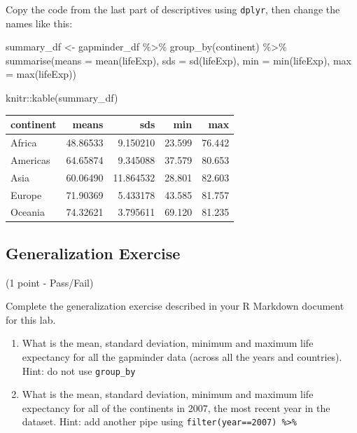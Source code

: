 \documentclass[
]{book}
\newenvironment{Shaded}{\begin{snugshade}}{\end{snugshade}}
\newcommand{\AttributeTok}[1]{\textcolor[rgb]{0.77,0.63,0.00}{#1}}
\newcommand{\FunctionTok}[1]{\textcolor[rgb]{0.00,0.00,0.00}{#1}}
\newcommand{\NormalTok}[1]{#1}
\newcommand{\OtherTok}[1]{\textcolor[rgb]{0.56,0.35,0.01}{#1}}
\newcommand{\SpecialCharTok}[1]{\textcolor[rgb]{0.00,0.00,0.00}{#1}}
\begin{document}
Copy the code from the last part of descriptives using \texttt{dplyr}, then change the names like this:

\begin{Shaded}
\begin{Highlighting}[]
\NormalTok{summary\_df }\OtherTok{\textless{}{-}}\NormalTok{ gapminder\_df }\SpecialCharTok{\%\textgreater{}\%}
               \FunctionTok{group\_by}\NormalTok{(continent) }\SpecialCharTok{\%\textgreater{}\%}
               \FunctionTok{summarise}\NormalTok{(}\AttributeTok{means =} \FunctionTok{mean}\NormalTok{(lifeExp),}
                         \AttributeTok{sds =} \FunctionTok{sd}\NormalTok{(lifeExp),}
                         \AttributeTok{min =} \FunctionTok{min}\NormalTok{(lifeExp),}
                         \AttributeTok{max =} \FunctionTok{max}\NormalTok{(lifeExp))}

\NormalTok{knitr}\SpecialCharTok{::}\FunctionTok{kable}\NormalTok{(summary\_df)}
\end{Highlighting}
\end{Shaded}

\begin{tabular}{l|r|r|r|r}
\hline
continent & means & sds & min & max\\
\hline
Africa & 48.86533 & 9.150210 & 23.599 & 76.442\\
\hline
Americas & 64.65874 & 9.345088 & 37.579 & 80.653\\
\hline
Asia & 60.06490 & 11.864532 & 28.801 & 82.603\\
\hline
Europe & 71.90369 & 5.433178 & 43.585 & 81.757\\
\hline
Oceania & 74.32621 & 3.795611 & 69.120 & 81.235\\
\hline
\end{tabular}

\hypertarget{generalization-exercise-1}{%
\subsection{Generalization Exercise}\label{generalization-exercise-1}}

(1 point - Pass/Fail)

Complete the generalization exercise described in your R Markdown document for this lab.

\begin{enumerate}
\def\labelenumi{\arabic{enumi}.}
\item
  What is the mean, standard deviation, minimum and maximum life expectancy for all the gapminder data (across all the years and countries). Hint: do not use \texttt{group\_by}
\item
  What is the mean, standard deviation, minimum and maximum life expectancy for all of the continents in 2007, the most recent year in the dataset. Hint: add another pipe using \texttt{filter(year==2007)\ \%\textgreater{}\%}
\end{enumerate}
\end{document}
